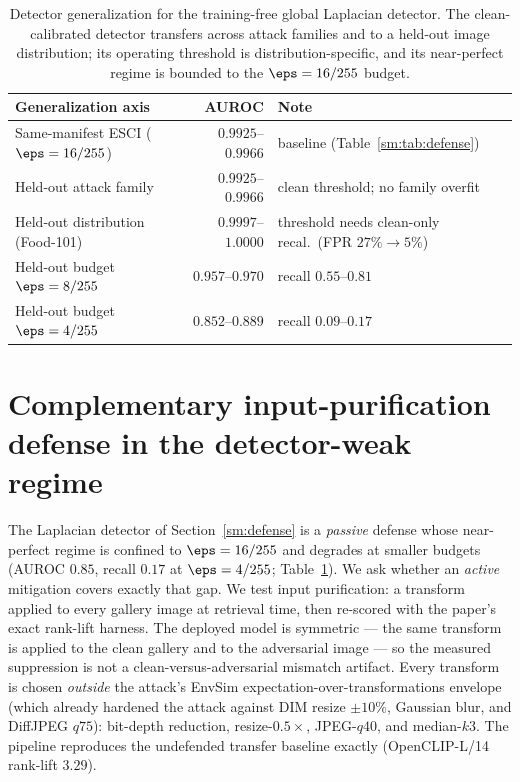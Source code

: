 \begin{table}[t]
\centering
\caption{Detector generalization for the training-free global Laplacian detector. The clean-calibrated detector transfers across attack families and to a held-out image distribution; its operating threshold is distribution-specific, and its near-perfect regime is bounded to the $\eps = 16/255$ budget.}
\label{sm:tab:detector-gen}
\footnotesize
\setlength{\tabcolsep}{4pt}
\begin{tabular}{@{}p{} r p{}@{}}
\toprule
Generalization axis & AUROC & Note \\
\midrule
Same-manifest ESCI ($\eps = 16/255$) & $0.9925$--$0.9966$ & baseline (Table~\ref{sm:tab:defense}) \\
Held-out attack family               & $0.9925$--$0.9966$ & clean threshold; no family overfit \\
Held-out distribution (Food-101)     & $0.9997$--$1.0000$ & threshold needs clean-only recal.\ (FPR $27\%{\to}5\%$) \\
Held-out budget $\eps = 8/255$       & $0.957$--$0.970$   & recall $0.55$--$0.81$ \\
Held-out budget $\eps = 4/255$       & $0.852$--$0.889$   & recall $0.09$--$0.17$ \\
\bottomrule
\end{tabular}
\end{table}

\section{Complementary input-purification defense in the detector-weak regime}
\label{sm:purify}

The Laplacian detector of Section~\ref{sm:defense} is a \emph{passive} defense whose near-perfect regime is confined to $\eps = 16/255$ and degrades at smaller budgets (AUROC $0.85$, recall $0.17$ at $\eps = 4/255$; Table~\ref{sm:tab:detector-gen}). We ask whether an \emph{active} mitigation covers exactly that gap. We test input purification: a transform applied to every gallery image at retrieval time, then re-scored with the paper's exact rank-lift harness. The deployed model is symmetric --- the same transform is applied to the clean gallery and to the adversarial image --- so the measured suppression is not a clean-versus-adversarial mismatch artifact. Every transform is chosen \emph{outside} the attack's EnvSim expectation-over-transformations envelope (which already hardened the attack against DIM resize $\pm 10\%$, Gaussian blur, and DiffJPEG $q75$): bit-depth reduction, resize-$0.5\times$, JPEG-$q40$, and median-$k3$. The pipeline reproduces the undefended transfer baseline exactly (OpenCLIP-L/14 rank-lift $3.29$).


